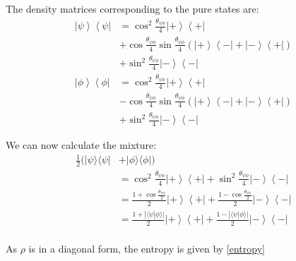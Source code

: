 \documentclass[10pt,twocolumn, nofootinbib]{revtex4-2}
\begin{document}
The density matrices corresponding to the pure states are:
\begin{align*}
	\left|\psi\right>\left<\psi\right|&=\cos^2\frac{\theta_{\psi\phi}}{4}\left|+\right>\left<+\right|\\
	&+\cos\frac{\theta_{\psi\phi}}{4}\sin\frac{\theta_{\psi\phi}}{4}\left(\left|+\right>\left<-\right|+\left|-\right>\left<+\right|\right) \\
	&+\sin^2\frac{\theta_{\psi\phi}}{4}\left|-\right>\left<-\right| \\
	\left|\phi\right>\left<\phi\right|&=\cos^2\frac{\theta_{\psi\phi}}{4}\left|+\right>\left<+\right|\\
	&-\cos\frac{\theta_{\psi\phi}}{4}\sin\frac{\theta_{\psi\phi}}{4}\left(\left|+\right>\left<-\right|+\left|-\right>\left<+\right|\right) \\
	&+\sin^2\frac{\theta_{\psi\phi}}{4}\left|-\right>\left<-\right|
\end{align*}

We can now calculate the mixture:
\begin{align*}
	\frac{1}{2}(|\psi\rangle\langle\psi| &+ |\phi\rangle\langle\phi|) \\
	&=\cos^2\frac{\theta_{\psi\phi}}{4}\left|+\right>\left<+\right| +\sin^2\frac{\theta_{\psi\phi}}{4}\left|-\right>\left<-\right| \\
	&=\frac{1+\cos\frac{\theta_{\psi\phi}}{2}}{2}\left|+\right>\left<+\right| +\frac{1-\cos\frac{\theta_{\psi\phi}}{2}}{2}\left|-\right>\left<-\right| \\
	&=\frac{1+|\langle\psi|\phi\rangle|}{2}\left|+\right>\left<+\right| +\frac{1-|\langle\psi|\phi\rangle|}{2}\left|-\right>\left<-\right| \\
\end{align*}

As $\rho$ is in a diagonal form, the entropy is given by \ref{entropy}



\end{document}
